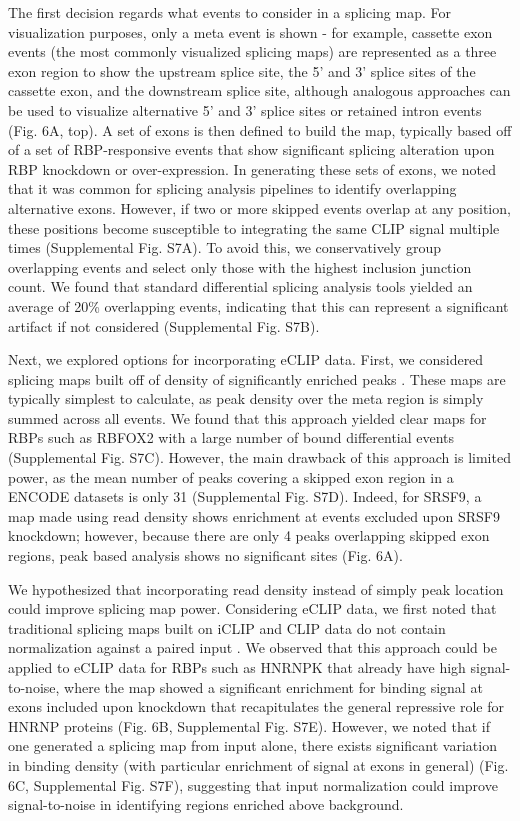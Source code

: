 The first decision regards what events to consider in a splicing map. For visualization purposes, only a meta event is shown - for example, cassette exon events (the most commonly visualized splicing maps) are represented as a three exon region to show the upstream splice site, the 5’ and 3’ splice sites of the cassette exon, and the downstream splice site, although analogous approaches can be used to visualize alternative 5’ and 3’ splice sites or retained intron events (Fig. 6A, top). A set of exons is then defined to build the map, typically based off of a set of RBP-responsive events that show significant splicing alteration upon RBP knockdown or over-expression. In generating these sets of exons, we noted that it was common for splicing analysis pipelines to identify overlapping alternative exons. However, if two or more skipped events overlap at any position, these positions become susceptible to integrating the same CLIP signal multiple times (Supplemental Fig. S7A). To avoid this, we conservatively group overlapping events and select only those with the highest inclusion junction count. We found that standard differential splicing analysis tools yielded an average of 20\% overlapping events, indicating that this can represent a significant artifact if not considered (Supplemental Fig. S7B).

Next, we explored options for incorporating eCLIP data. First, we considered splicing maps built off of density of significantly enriched peaks \cite{Huelga2012}. These maps are typically simplest to calculate, as peak density over the meta region is simply summed across all events. We found that this approach yielded clear maps for RBPs such as RBFOX2 with a large number of bound differential events (Supplemental Fig. S7C). However, the main drawback of this approach is limited power, as the mean number of peaks covering a skipped exon region in a ENCODE datasets is only 31 (Supplemental Fig. S7D). Indeed, for SRSF9, a map made using read density shows enrichment at events excluded upon SRSF9 knockdown; however, because there are only 4 peaks overlapping skipped exon regions, peak based analysis shows no significant sites (Fig. 6A).

We hypothesized that incorporating read density instead of simply peak location could improve splicing map power. Considering eCLIP data, we first noted that traditional splicing maps built on iCLIP and CLIP data do not contain normalization against a paired input \cite{Konig2010}. We observed that this approach could be applied to eCLIP data for RBPs such as HNRNPK that already have high signal-to-noise, where the map showed a significant enrichment for binding signal at exons included upon knockdown that recapitulates the general repressive role for HNRNP proteins (Fig. 6B, Supplemental Fig. S7E). However, we noted that if one generated a splicing map from input alone, there exists significant variation in binding density (with particular enrichment of signal at exons in general) (Fig. 6C, Supplemental Fig. S7F), suggesting that input normalization could improve signal-to-noise in identifying regions enriched above background.

